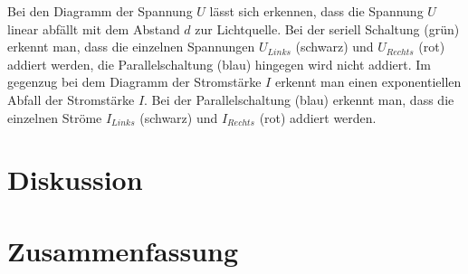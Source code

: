 \documentclass[12pt,a4paper,twoside]{article}
\begin{document}
\noindent
Bei den Diagramm der Spannung $U$ lässt sich erkennen, dass die Spannung $U$ linear abfällt mit dem Abstand $d$ zur Lichtquelle. Bei der seriell Schaltung (grün) erkennt man, dass die einzelnen Spannungen $U_{Links}$ (schwarz) und $U_{Rechts}$ (rot) addiert werden, die Parallelschaltung (blau) hingegen wird nicht addiert. 
Im gegenzug bei dem Diagramm der Stromstärke $I$ erkennt man einen exponentiellen Abfall der Stromstärke $I$. Bei der Parallelschaltung (blau) erkennt man, dass die einzelnen Ströme $I_{Links}$ (schwarz) und $I_{Rechts}$ (rot) addiert werden. 

\section{Diskussion} %


\section{Zusammenfassung} %


\printbibliography[heading=bibintoc]
\end{document}
